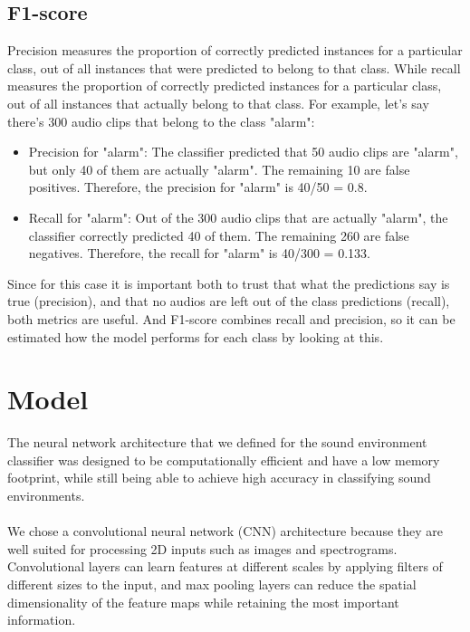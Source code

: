 \documentclass[12pt,oneside,a4paper,english]{article}
\begin{document}
\subsection{F1-score}
Precision measures the proportion of correctly predicted instances for a particular class, out of all instances that were predicted to belong to that class. While recall measures the proportion of correctly predicted instances for a particular class, out of all instances that actually belong to that class. For example, let's say there's 300 audio clips that belong to the class "alarm": 
\begin{itemize}
  \item Precision for "alarm": The classifier predicted that 50 audio clips are "alarm", but only 40 of them are actually "alarm". The remaining 10 are false positives. Therefore, the precision for "alarm" is 40/50 = 0.8.
  \item Recall for "alarm": Out of the 300 audio clips that are actually "alarm", the classifier correctly predicted 40 of them. The remaining 260 are false negatives. Therefore, the recall for "alarm" is 40/300 = 0.133.
\end{itemize}
Since for this case it is important both to trust that what the predictions say is true (precision), and that no audios are left out of the class predictions (recall), both metrics are useful. And F1-score combines recall and precision, so it can be estimated how the model performs for each class by looking at this.


\section{Model}
 The neural network architecture that we defined for the sound environment classifier was designed to be computationally efficient and have a low memory footprint, while still being able to achieve high accuracy in classifying sound environments.
\\
\\
We chose a convolutional neural network (CNN) architecture because they are well suited for processing 2D inputs such as images and spectrograms. Convolutional layers can learn features at different scales by applying filters of different sizes to the input, and max pooling layers can reduce the spatial dimensionality of the feature maps while retaining the most important information.
\end{document}
